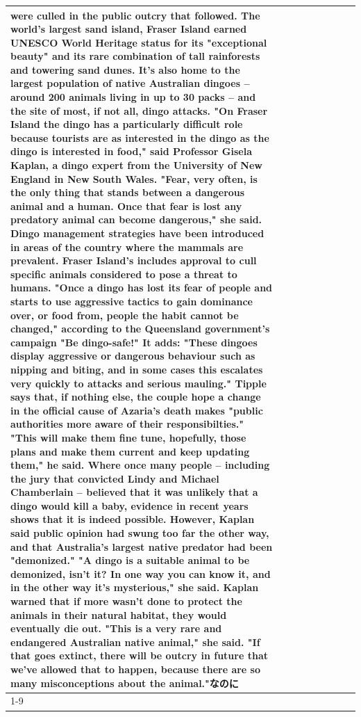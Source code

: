 \begin{table}[H]
\begin{tabular}{lllrlllll}
were culled in the public outcry that followed. The world's largest sand island, Fraser Island earned UNESCO World Heritage status for its "exceptional beauty" and its rare combination of tall rainforests and towering sand dunes. It's also home to the largest population of native Australian dingoes -- around 200 animals living in up to 30 packs -- and the site of most, if not all, dingo attacks. "On Fraser Island the dingo has a particularly difficult role because tourists are as interested in the dingo as the dingo is interested in food," said Professor Gisela Kaplan, a dingo expert from the University of New England in New South Wales. "Fear, very often, is the only thing that stands between a dangerous animal and a human. Once that fear is lost any predatory animal can become dangerous," she said. Dingo management strategies have been introduced in areas of the country where the mammals are prevalent. Fraser Island's includes approval to cull specific animals considered to pose a threat to humans. "Once a dingo has lost its fear of people and starts to use aggressive tactics to gain dominance over, or food from, people the habit cannot be changed," according to the Queensland government's campaign "Be dingo-safe!" It adds: "These dingoes display aggressive or dangerous behaviour such as nipping and biting, and in some cases this escalates very quickly to attacks and serious mauling." Tipple says that, if nothing else, the couple hope a change in the official cause of Azaria's death makes "public authorities more aware of their responsibilties." "This will make them fine tune, hopefully, those plans and make them current and keep updating them," he said. Where once many people -- including the jury that convicted Lindy and Michael Chamberlain -- believed that it was unlikely that a dingo would kill a baby, evidence in recent years shows that it is indeed possible. However, Kaplan said public opinion had swung too far the other way, and that Australia's largest native predator had been "demonized." "A dingo is a suitable animal to be demonized, isn't it? In one way you can know it, and in the other way it's mysterious," she said. Kaplan warned that if more wasn't done to protect the animals in their natural habitat, they would eventually die out. "This is a very rare and endangered Australian native animal," she said. "If that goes extinct, there will be outcry in future that we've allowed that to happen, because there are so many misconceptions about the animal."なのに \\
\cline{1-9}

\end{tabular}
\end{table}
